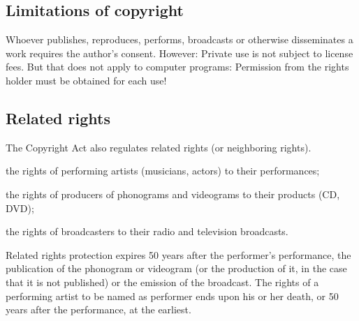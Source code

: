 \subsection{Limitations of copyright}
Whoever publishes, reproduces, performs, broadcasts or otherwise disseminates a work requires the author’s consent. However: Private use is not subject to license fees. But that does not apply to computer programs: Permission from the rights holder must be obtained for each use!

\subsection{Related rights}
The Copyright Act also regulates related rights (or neighboring rights).
\begin{compactitem}
	\item the rights of performing artists (musicians, actors) to their performances;
	\item the rights of producers of phonograms and videograms to their products (CD, DVD);
	\item the rights of broadcasters to their radio and television broadcasts.
\end{compactitem}
Related rights protection expires 50 years after the performer’s performance, the publication of the phonogram or videogram (or the production of it, in the case that it is not published) or the emission of the broadcast. The rights of a performing artist to be named as performer ends upon his or her death, or 50 years after the performance, at the earliest.

